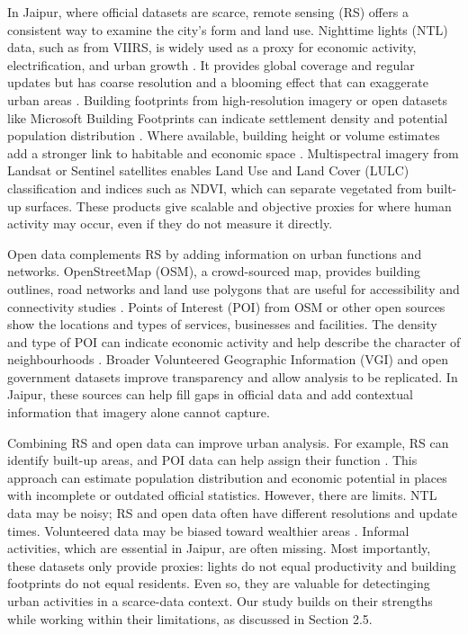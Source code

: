 \documentclass[
  12pt,
  oneside]{book}
\begin{document}
In Jaipur, where official datasets are scarce, remote sensing (RS) offers a consistent way to examine the city's form and land use. Nighttime lights (NTL) data, such as from VIIRS, is widely used as a proxy for economic activity, electrification, and urban growth \autocite{liHarmonizedGlobalNighttime2020,levinRemoteSensingNight2020}. It provides global coverage and regular updates but has coarse resolution and a blooming effect that can exaggerate urban areas \autocite{xiaoDetectingChinasUrban2014}. Building footprints from high-resolution imagery or open datasets like Microsoft Building Footprints can indicate settlement density and potential population distribution \autocite{psBuildingFootprintExtraction2023,leykAssessingAccuracyMultitemporal2018}. Where available, building height or volume estimates add a stronger link to habitable and economic space \autocite{biljeckiPopulationEstimationUsing2016}. Multispectral imagery from Landsat or Sentinel satellites enables Land Use and Land Cover (LULC) classification and indices such as NDVI, which can separate vegetated from built-up surfaces. These products give scalable and objective proxies for where human activity may occur, even if they do not measure it directly.

Open data complements RS by adding information on urban functions and networks. OpenStreetMap (OSM), a crowd-sourced map, provides building outlines, road networks and land use polygons that are useful for accessibility and connectivity studies \autocite{barrington-leighWorldsUsergeneratedRoad2017,jokararsanjaniQualityAssessmentContributed2015a}. Points of Interest (POI) from OSM or other open sources show the locations and types of services, businesses and facilities. The density and type of POI can indicate economic activity and help describe the character of neighbourhoods \autocite{arribas-belAccidentalOpenEverywhere2014}. Broader Volunteered Geographic Information (VGI) and open government datasets improve transparency and allow analysis to be replicated. In Jaipur, these sources can help fill gaps in official data and add contextual information that imagery alone cannot capture.

Combining RS and open data can improve urban analysis. For example, RS can identify built-up areas, and POI data can help assign their function \autocite{linIdentifyingUrbanBuilding2021}. This approach can estimate population distribution and economic potential in places with incomplete or outdated official statistics. However, there are limits. NTL data may be noisy; RS and open data often have different resolutions and update times. Volunteered data may be biased toward wealthier areas \autocite{chengUrbanLandExtraction2018,al-bakriTenYearsOpenStreetMap2015}. Informal activities, which are essential in Jaipur, are often missing. Most importantly, these datasets only provide proxies: lights do not equal productivity and building footprints do not equal residents. Even so, they are valuable for detectinging urban activities in a scarce-data context. Our study builds on their strengths while working within their limitations, as discussed in Section 2.5.
\end{document}
